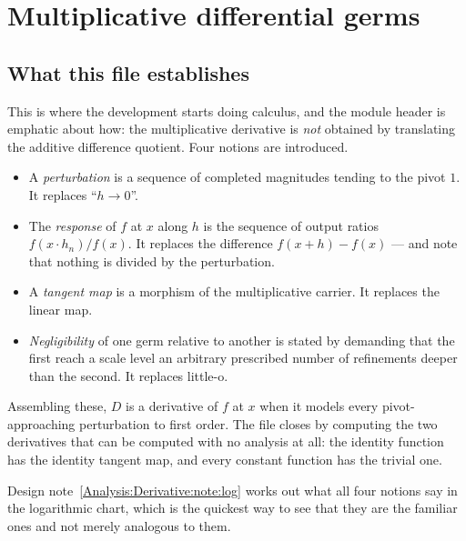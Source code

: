 
\section{Multiplicative differential germs}
\label{Analysis:Derivative:sec}


\subsection*{What this file establishes}

This is where the development starts doing calculus, and the module header is
emphatic about how: the multiplicative derivative is \emph{not} obtained by
translating the additive difference quotient.  Four notions are introduced.

\begin{itemize}[leftmargin=1.4em]
\item A \emph{perturbation} is a sequence of completed magnitudes tending to
  the pivot $1$.  It replaces ``$h \to 0$''.
\item The \emph{response} of $f$ at $x$ along $h$ is the sequence of output
  ratios $f(x \cdot h_n)/f(x)$.  It replaces the difference $f(x+h) - f(x)$
  --- and note that nothing is divided by the perturbation.
\item A \emph{tangent map} is a morphism of the multiplicative carrier.  It
  replaces the linear map.
\item \emph{Negligibility} of one germ relative to another is stated by
  demanding that the first reach a scale level an arbitrary prescribed number
  of refinements deeper than the second.  It replaces little-o.
\end{itemize}

Assembling these, $D$ is a derivative of $f$ at $x$ when it models every
pivot-approaching perturbation to first order.  The file closes by computing
the two derivatives that can be computed with no analysis at all: the identity
function has the identity tangent map, and every constant function has the
trivial one.

Design note~\ref{Analysis:Derivative:note:log} works out what all four notions
say in the logarithmic chart, which is the quickest way to see that they are
the familiar ones and not merely analogous to them.

